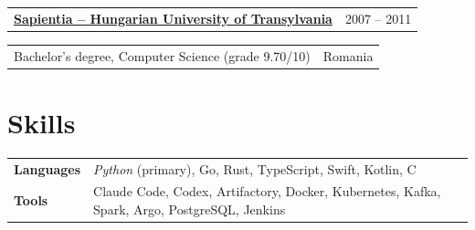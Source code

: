 \documentclass[10pt]{article}
\makeatletter
\newcommand{\twoColumns}[2]{%
  \noindent
  \begin{tabularx}{\textwidth}{@{}X r@{}}#2 & {\color{muted}#1}\\
  \end{tabularx}\par
}
\newcommand{\cvrule}{}
\makeatother
\begin{document}
\twoColumns{2007 -- 2011}{ \textbf{\href{https://sapientia.ro/}{Sapientia -- Hungarian University of Transylvania}} }
\twoColumns{Romania}{Bachelor's degree, Computer Science (grade 9.70/10)}

\section*{Skills}
\cvrule%
\begin{tabular}{@{}l p{}@{}}
  \textbf{Languages} & \emph{Python} (primary), Go, Rust, TypeScript, Swift, Kotlin, C                            \\
  \textbf{Tools}     & Claude Code, Codex, Artifactory, Docker, Kubernetes, Kafka, Spark, Argo,
  PostgreSQL, Jenkins       \\
\end{tabular}
\end{document}
